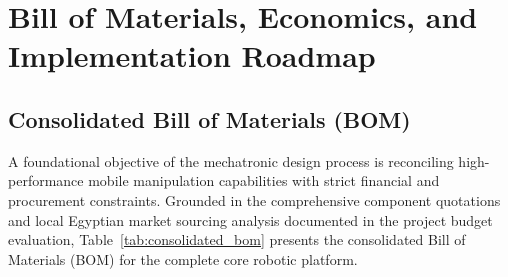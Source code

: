 \section{Bill of Materials, Economics, and Implementation Roadmap}
\label{sec:bom_roadmap}

\subsection{Consolidated Bill of Materials (BOM)}
A foundational objective of the mechatronic design process is reconciling high-performance mobile manipulation capabilities with strict financial and procurement constraints. Grounded in the comprehensive component quotations and local Egyptian market sourcing analysis documented in the project budget evaluation, Table~\ref{tab:consolidated_bom} presents the consolidated Bill of Materials (BOM) for the complete core robotic platform.

